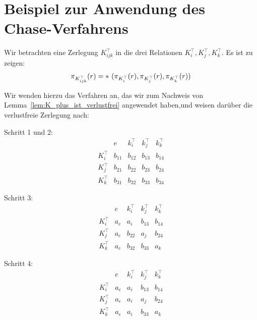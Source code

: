 \chapter{Beispiel zur Anwendung des Chase-Verfahrens}

\begin{tcolorbox}[excursusbox,title={Nachweis der verlustfreien Zerlegung anhand $K^\top_i, K^\top_j, K^\top_k$}]
Wir betrachten eine Zerlegung $K_{ijk}^\top$ in die drei Relationen  $K^\top_i, K^\top_j, K^\top_k$.
Es ist zu zeigen:
    \[
        \pi_{K_{ijk}^{\top}}(r) = *\ (\pi_{K^{\top}_i}(r), \pi_{K^{\top}_j}(r), \pi_{K^{\top}_k}(r))
    \]

    \noindent
    Wir wenden hierzu das Verfahren an, das wir zum Nachweis von Lemma~\ref{lem:K_plus_ist_verlustfrei} angewendet haben,und weisen darüber die verlustfreie Zerlegung nach:

    \bigskip
    Schritt 1 und 2:
    \[
        \begin{array}{c|cccc}
            & e & k^{\top}_i & k^{\top}_j & k^{\top}_k \\
            \hline
            K^{\top}_i     & b_{11} & b_{12} & b_{13} & b_{14} \\
            K^{\top}_j     & b_{21} & b_{22} & b_{23} & b_{24} \\
            K^{\top}_k     & b_{31} & b_{32} & b_{33} & b_{34}
        \end{array}
    \]

    \medskip
    Schritt 3:
    \[
        \begin{array}{c|cccc}
            & e & k^{\top}_i & k^{\top}_j & k^{\top}_k \\
            \hline
            K^{\top}_i     & a_e & a_i & b_{13} & b_{14} \\
            K^{\top}_j     & a_e & b_{22} & a_j & b_{24} \\
            K^{\top}_k     & a_e & b_{32} & b_{33} & a_k
        \end{array}
    \]

    \medskip
    Schritt 4:
    \[
        \begin{array}{c|cccc}
            & e & k^{\top}_i & k^{\top}_j & k^{\top}_k \\
            \hline
            K^{\top}_i     & a_e & a_i & b_{13} & b_{14} \\
            K^{\top}_j     & a_e & a_i & a_j & b_{24} \\
            K^{\top}_k     & a_e & a_i & b_{33} & a_k
        \end{array}
    \]


\end{tcolorbox}
